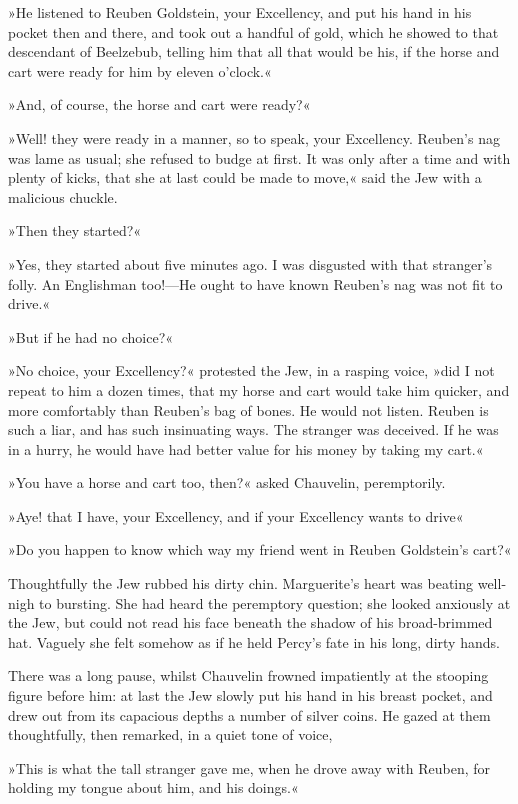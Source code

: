 »He listened to Reuben Goldstein, your Excellency, and put his hand in his pocket then and there, and took out a handful of gold, which he showed to that descendant of Beelzebub, telling him that all that would be his, if the horse and cart were ready for him by eleven o'clock.«

»And, of course, the horse and cart were ready?«

»Well! they were ready in a manner, so to speak, your Excellency. Reuben's nag was lame as usual; she refused to budge at first. It was only after a time and with plenty of kicks, that she at last could be made to move,« said the Jew with a malicious chuckle.

»Then they started?«

»Yes, they started about five minutes ago. I was disgusted with that stranger's folly. An Englishman too!—He ought to have known Reuben's nag was not fit to drive.«

»But if he had no choice?«

»No choice, your Excellency?« protested the Jew, in a rasping voice, »did I not repeat to him a dozen times, that my horse and cart would take him quicker, and more comfortably than Reuben's bag of bones. He would not listen. Reuben is such a liar, and has such insinuating ways. The stranger was deceived. If he was in a hurry, he would have had better value for his money by taking my cart.«

»You have a horse and cart too, then?« asked Chauvelin, peremptorily.

»Aye! that I have, your Excellency, and if your Excellency wants to drive\textellipsis«

»Do you happen to know which way my friend went in Reuben Goldstein's cart?«

Thoughtfully the Jew rubbed his dirty chin. Marguerite's heart was beating well-nigh to bursting. She had heard the peremptory question; she looked anxiously at the Jew, but could not read his face beneath the shadow of his broad-brimmed hat. Vaguely she felt somehow as if he held Percy's fate in his long, dirty hands.

There was a long pause, whilst Chauvelin frowned impatiently at the stooping figure before him: at last the Jew slowly put his hand in his breast pocket, and drew out from its capacious depths a number of silver coins. He gazed at them thoughtfully, then remarked, in a quiet tone of voice,\longdash


»This is what the tall stranger gave me, when he drove away with Reuben, for holding my tongue about him, and his doings.«

